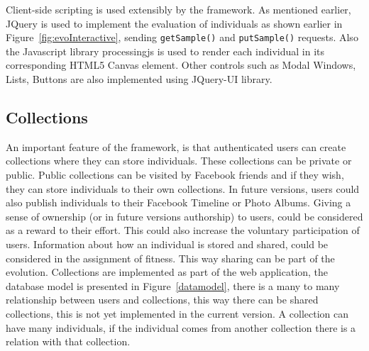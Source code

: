 \documentclass{sig-alternate}
\begin{document}
Client-side scripting is used extensibly by the framework. As mentioned earlier, JQuery is used to implement the evaluation of individuals as shown earlier in Figure~\ref{fig:evoInteractive}, sending \texttt{getSample()} and \texttt{putSample()} requests.  Also the Javascript library processingjs is used to render each individual in its corresponding HTML5 Canvas element. Other controls such as Modal Windows, Lists, Buttons are also implemented using JQuery-UI library.

\subsection{Collections}
An important feature of the framework, is that authenticated users can create collections where they can store individuals. These collections can be private or public. Public collections can be visited by Facebook friends and if they wish, they can store individuals to their own collections. In future versions, users could also publish individuals to their Facebook Timeline or Photo Albums. Giving a sense of ownership (or in future versions authorship) to users, could be considered as a reward to their effort. This could also increase the voluntary participation of users. Information about how an individual is stored and shared, could be considered in the assignment of fitness. This way sharing can be part of the evolution. Collections are implemented as part of the web application, the database model is presented in Figure~\ref{datamodel}, there is a many to many relationship between users and collections, this way there can be shared collections, this is not yet implemented in the current version.  A collection can have many individuals, if the individual comes from another collection there is a relation with that collection. 
\end{document}

